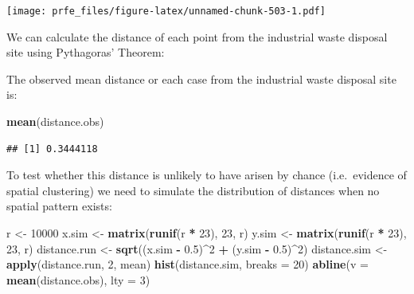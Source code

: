 \documentclass[12pt,a4paper]{book}
\newenvironment{Shaded}{\begin{snugshade}}{\end{snugshade}}
\newcommand{\DataTypeTok}[1]{\textcolor[rgb]{0.13,0.29,0.53}{#1}}
\newcommand{\DecValTok}[1]{\textcolor[rgb]{0.00,0.00,0.81}{#1}}
\newcommand{\FloatTok}[1]{\textcolor[rgb]{0.00,0.00,0.81}{#1}}
\newcommand{\KeywordTok}[1]{\textcolor[rgb]{0.13,0.29,0.53}{\textbf{#1}}}
\newcommand{\NormalTok}[1]{#1}
\newcommand{\OperatorTok}[1]{\textcolor[rgb]{0.81,0.36,0.00}{\textbf{#1}}}
\newcommand{\StringTok}[1]{\textcolor[rgb]{0.31,0.60,0.02}{#1}}
\theoremstyle{definition}
\theoremstyle{definition}
\theoremstyle{definition}
\theoremstyle{remark}
\begin{document}
\texttt{[image: prfe\_files/figure-latex/unnamed-chunk-503-1.pdf]}

We can calculate the distance of each point from the industrial waste
disposal site using Pythagoras' Theorem:

\begin{Shaded}
\end{Shaded}

The observed mean distance or each case from the industrial waste
disposal site is:

\begin{Shaded}
\begin{Highlighting}[]
\KeywordTok{mean}\NormalTok{(distance.obs)}
\end{Highlighting}
\end{Shaded}

\begin{verbatim}
## [1] 0.3444118
\end{verbatim}

To test whether this distance is unlikely to have arisen by chance
(i.e.~evidence of spatial clustering) we need to simulate the
distribution of distances when no spatial pattern exists:

\begin{Shaded}
\begin{Highlighting}[]
\NormalTok{r <-}\StringTok{ }\DecValTok{10000}
\NormalTok{x.sim <-}\StringTok{ }\KeywordTok{matrix}\NormalTok{(}\KeywordTok{runif}\NormalTok{(r }\OperatorTok{*}\StringTok{ }\DecValTok{23}\NormalTok{), }\DecValTok{23}\NormalTok{, r)}
\NormalTok{y.sim <-}\StringTok{ }\KeywordTok{matrix}\NormalTok{(}\KeywordTok{runif}\NormalTok{(r }\OperatorTok{*}\StringTok{ }\DecValTok{23}\NormalTok{), }\DecValTok{23}\NormalTok{, r)}
\NormalTok{distance.run <-}\StringTok{ }\KeywordTok{sqrt}\NormalTok{((x.sim }\OperatorTok{-}\StringTok{ }\FloatTok{0.5}\NormalTok{)}\OperatorTok{^}\DecValTok{2} \OperatorTok{+}\StringTok{ }\NormalTok{(y.sim }\OperatorTok{-}\StringTok{ }\FloatTok{0.5}\NormalTok{)}\OperatorTok{^}\DecValTok{2}\NormalTok{)}
\NormalTok{distance.sim <-}\StringTok{ }\KeywordTok{apply}\NormalTok{(distance.run, }\DecValTok{2}\NormalTok{, mean)}
\KeywordTok{hist}\NormalTok{(distance.sim, }\DataTypeTok{breaks =} \DecValTok{20}\NormalTok{)}
\KeywordTok{abline}\NormalTok{(}\DataTypeTok{v =} \KeywordTok{mean}\NormalTok{(distance.obs), }\DataTypeTok{lty =} \DecValTok{3}\NormalTok{)}
\end{Highlighting}
\end{Shaded}
\end{document}
